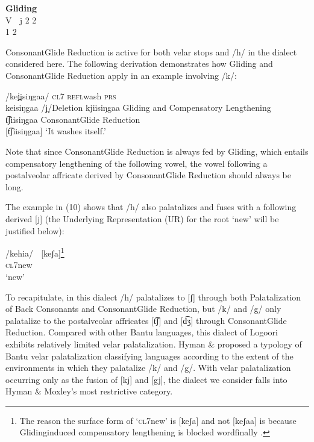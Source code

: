 \documentclass[output=paper]{langsci/langscibook}
\begin{document}
\ea{}
 \textbf{Gliding}\\{}
V  j 2 2\\{}
 1    2\\{}
\z

ConsonantGlide Reduction is active for both velar stops and /h/ in the dialect considered here. The following derivation demonstrates how Gliding and ConsonantGlide Reduction apply in an example involving /k/:

\ea{}
/kej̪isiŋgaa/  \textsc{cl7 refl}wash \textsc{prs}\\{} 
keisiŋgaa    /j̪/Deletion{\footnotemark}
kjiisiŋgaa    Gliding and Compensatory Lengthening\\{}
t͡ʃiisiŋgaa    ConsonantGlide Reduction\\{}
[t͡ʃiisiŋgaa]  ‘It washes itself.’\\{}
\z
{} 

Note that since ConsonantGlide Reduction is always fed by Gliding, which entails compensatory lengthening of the following vowel, the vowel following a postalveolar affricate derived by ConsonantGlide Reduction should always be long.

The example in (10) shows that /h/ also palatalizes and fuses with a following derived [j] (the Underlying Representation (UR) for the root ‘new’ will be justified below):


\ea{}
/kehia/{\rmfnm}   [keʃa]\footnote{   The reason the surface form of ‘\textsc{cl7}new’ is [keʃa] and not [keʃaa] is because Glidinginduced compensatory lengthening is blocked wordfinally \citep{Leung1991}.} \\{}
\textsc{cl7}new\\{}
\glt ‘new’
\z
{}  



To recapitulate, in this dialect /h/ palatalizes to [ʃ] through both Palatalization of Back Consonants and ConsonantGlide Reduction, but /k/ and /g/ only palatalize to the postalveolar affricates [t͡ʃ] and [d͡ʒ] through ConsonantGlide Reduction. Compared with other Bantu languages, this dialect of Logoori exhibits relatively limited velar palatalization. Hyman \& \citet{Moxley1996} proposed a typology of Bantu velar palatalization classifying languages according to the extent of the environments in which they palatalize /k/ and /g/. With velar palatalization occurring only as the fusion of [kj] and [gj], the dialect we consider falls into Hyman \& Moxley’s most restrictive category. 
\end{document}
